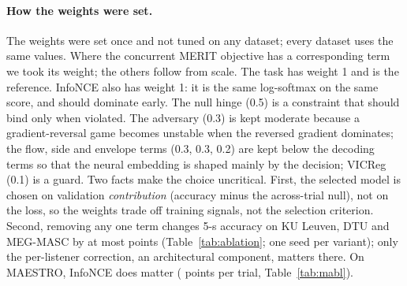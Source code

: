 \documentclass[10pt,twocolumn,letterpaper]{article}
\begin{document}
\paragraph{How the weights were set.} The weights were set once and not tuned on any dataset;
every dataset uses the same values. Where the concurrent MERIT
objective \citep{merit2026} has a corresponding term we took its weight; the others follow
from scale. The task has weight 1 and is the reference. InfoNCE also has weight 1: it is
the same log-softmax on the same score, and should dominate early. The null hinge (0.5) is
a constraint that should bind only when violated. The adversary (0.3) is kept moderate
because a gradient-reversal game becomes unstable when the reversed gradient dominates; the
flow, side and envelope terms (0.3, 0.3, 0.2) are kept below the decoding terms so that the
neural embedding is shaped mainly by the decision; VICReg (0.1) is a guard. Two facts make
the choice uncritical. First, the selected model is chosen on validation
\emph{contribution} (accuracy minus the across-trial null), not on the loss, so the
weights trade off training signals, not the selection criterion. Second, removing any one
term changes 5-s accuracy on KU Leuven, DTU and MEG-MASC by at most \ablOtherMax{} points
(Table~\ref{tab:ablation}; one seed per variant); only the per-listener correction, an
architectural component, matters there. On MAESTRO, InfoNCE does matter
(\maAblNce{} points per trial, Table~\ref{tab:mabl}).

\begin{table}[h]\centering\small
\caption{Weighted loss terms during training (each already multiplied by its weight; mean
over folds and seeds of the logged epoch average), at the first epoch and at the selected
epoch. Chance: value of a term for a decoder at chance ($K=2$ candidates, batch $B=32$).
``--'': the side head needs two talkers in known positions. Five Broderick runs evaluated
from saved checkpoints have no logged history and are omitted.}\label{tab:loss_terms}

\end{table}
\end{document}
